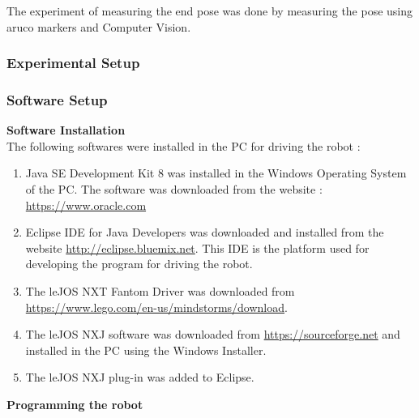 The experiment of measuring the end pose was done by measuring the pose using aruco markers and Computer Vision.
   

\subsubsection{Experimental Setup}
	
	\subsubsection{Software Setup}
		\vspace{0.3cm}
	\textbf{Software Installation}\\
			
		The following softwares were installed in the PC for driving the robot :
			\vspace{0.3cm}
			\begin{enumerate}
				
				\item
				Java SE Development Kit 8 was installed in the Windows Operating System of the PC. The software was downloaded from the website :\\ \href{https://www.oracle.com/technetwork/java/javase/downloads/jdk8-downloads-2133151.html}{https://www.oracle.com}
				\vspace{0.2cm}
				
				\item
				Eclipse IDE for Java Developers was downloaded and installed from the website 
				\href{http://eclipse.bluemix.net/packages/neon/?JAVA-WIN32}{http://eclipse.bluemix.net}. This IDE is the platform used for developing the program for driving the robot.
				\vspace{0.2cm}
				
				\item
				The leJOS NXT Fantom Driver was downloaded from  \href{https://www.lego.com/en-us/mindstorms/downloads}{https://www.lego.com/en-us/mindstorms/download}. 
				\vspace{0.2cm}
				
				\item
				The leJOS NXJ software was downloaded from \href{https://sourceforge.net/projects/nxt.lejos.p/files/}{https://sourceforge.net} and installed in the PC using the Windows Installer.
				\vspace{0.2cm}
				
				\item
				The leJOS NXJ plug-in was added to Eclipse.
				\vspace{0.5cm}
								
			\end{enumerate}
			\vspace{0.3cm}
			\textbf{Programming the robot}
	
